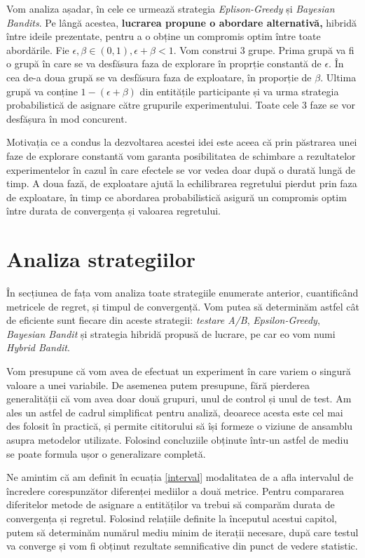 Vom analiza așadar, în cele ce urmează strategia \textit{Eplison-Greedy} și \textit{Bayesian Bandits}. Pe lângă acestea, \textbf{lucrarea propune o abordare alternativă,} hibridă între ideile prezentate, pentru a o obține un compromis optim între toate abordările. Fie $\epsilon, \beta \in(0, 1), \epsilon + \beta < 1$. Vom construi 3 grupe. Prima grupă va fi o grupă în care se va desfăsura faza de explorare în proprție constantă de $\epsilon$. În cea de-a doua grupă se va desfăsura faza de exploatare, în proporție de $\beta$. Ultima grupă va conține $1 - (\epsilon + \beta)$ din entitățile participante și va urma strategia probabilistică de asignare către grupurile experimentului. Toate cele 3 faze se vor desfășura în mod concurent.

Motivația ce a condus la dezvoltarea acestei idei este aceea că prin păstrarea unei faze de explorare constantă vom garanta posibilitatea de schimbare a rezultatelor experimentelor în cazul în care efectele se vor vedea doar după o durată lungă de timp. A doua fază, de exploatare ajută la echilibrarea regretului pierdut prin faza de exploatare, în timp ce abordarea probabilistică asigură un compromis optim între durata de convergența și valoarea regretului.

\section{Analiza strategiilor}

În secțiunea de fața vom analiza toate strategiile enumerate anterior, cuantificând metricele de regret, și timpul de convergență. Vom putea să determinăm astfel cât de eficiente sunt fiecare din aceste strategii: \textit{testare A/B}, \textit{Epsilon-Greedy}, \textit{Bayesian Bandit} și strategia hibridă propusă de lucrare, pe car eo vom numi \textit{Hybrid Bandit}. 

Vom presupune că vom avea de efectuat un experiment în care variem o singură valoare a unei variabile. De asemenea putem presupune, fără pierderea generalității că vom avea doar două grupuri, unul de control și unul de test. Am ales un astfel de cadrul simplificat pentru analiză, deoarece acesta este cel mai des folosit în practică, și permite cititorului să își formeze o viziune de ansamblu asupra metodelor utilizate. Folosind concluziile obținute într-un astfel de mediu se poate formula ușor o generalizare completă.

Ne amintim că am definit în ecuația \ref{interval} modalitatea de a afla intervalul de încredere corespunzător diferenței mediilor a două metrice. Pentru compararea diferitelor metode de asignare a entităților va trebui să comparăm durata de convergența și regretul. Folosind relațiile definite la începutul acestui capitol, putem să determinăm numărul mediu minim de iterații necesare, după care testul va converge și vom fi obținut rezultate semnificative din punct de vedere statistic. 

